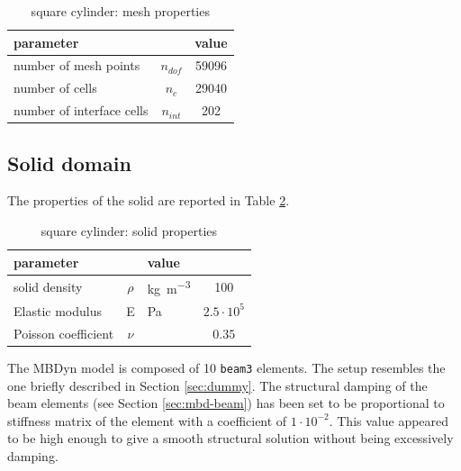 \begin{table}[!htb]
	\begin{center}
		\begin{tabular}{ l c | c } 
			parameter & & value   \\ 
			\hline
			number of mesh points  & $n_{dof}$ & 59096     \\
			number of cells & $n_c$ & 29040  \\
			number of interface cells  & $n_{int}$ & 202  \\			
		\end{tabular}
	\end{center}
	\caption{square cylinder: mesh properties}
	\label{table:sq-mesh}
\end{table}


\subsection{Solid domain}

The properties of the solid are reported in Table \ref{table:sq-solid}.

\begin{table}[!htb]
	\begin{center}
		\begin{tabular}{ l c  l | c } 
			parameter & & value &    \\ 
			\hline
			solid density  & $\rho$ & \si{kg.m^{-3}} & 100    \\
			Elastic modulus  & E & \si{Pa} & $2.5\cdot 10^5$    \\
			Poisson coefficient & $\nu$ & & $0.35$  \\
		\end{tabular}
	\end{center}
	\caption{square cylinder: solid properties}
	\label{table:sq-solid}
\end{table}

The MBDyn model is composed of 10 \texttt{beam3} elements. The setup resembles the one briefly described in Section \ref{sec:dummy}. The structural damping of the beam elements (see Section \ref{sec:mbd-beam}) has been set to be proportional to stiffness matrix of the element with a coefficient of $1\cdot10^{-2}$. This value appeared to be high enough to give a smooth structural solution without being excessively damping.

